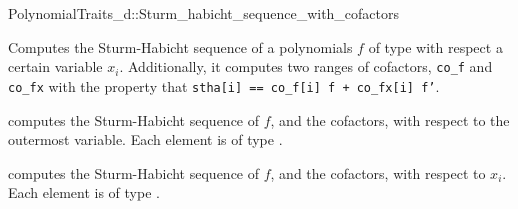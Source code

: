 \begin{ccRefConcept}{PolynomialTraits_d::Sturm_habicht_sequence_with_cofactors}
\ccDefinition

Computes the Sturm-Habicht sequence of a polynomials $f$ of type 
 with respect a certain variable $x_i$.
Additionally, it computes two ranges of cofactors, {\tt co\_f} and {\tt co\_fx}
with the property that {\tt stha[i] == co\_f[i] f + co\_fx[i] f'}.

\ccOperations
{}
         { computes the Sturm-Habicht sequence of $f$, and the cofactors, 
           with respect to the outermost variable. Each element is of type
           .}

         { computes the Sturm-Habicht sequence of $f$, and the cofactors, 
           with respect to $x_i$. Each element is of type
           .}


\ccSeeAlso

\\
\\

\end{ccRefConcept}
